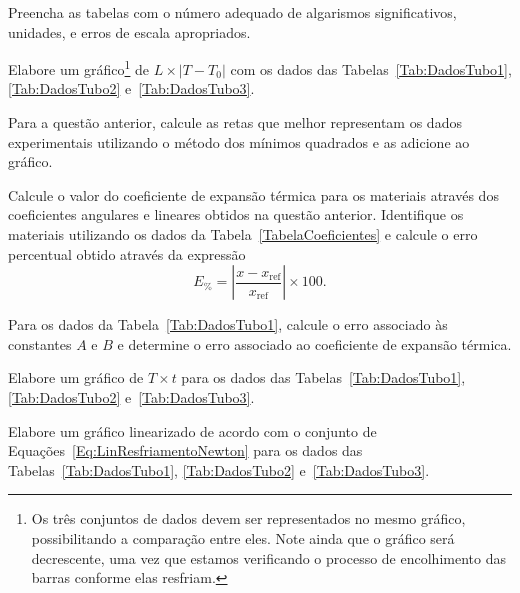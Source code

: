 \begin{question}[type={exam}]{0.5}
Preencha as tabelas com o número adequado de algarismos significativos, unidades, e erros de escala apropriados. 
\end{question}

\begin{question}[type={exam}]{1.0}
Elabore um gráfico\footnote{Os três conjuntos de dados devem ser representados no mesmo gráfico, possibilitando a comparação entre eles. Note ainda que o gráfico será decrescente, uma vez que estamos verificando o processo de encolhimento das barras conforme elas resfriam.} de $L \times |T - T_0|$ com os dados das Tabelas~\ref{Tab:DadosTubo1}, \ref{Tab:DadosTubo2} e~\ref{Tab:DadosTubo3}.
\end{question}

\begin{question}[type={exam}]{0.5}
Para a questão anterior, calcule as retas que melhor representam os dados experimentais utilizando o método dos mínimos quadrados e as adicione ao gráfico.
\end{question}
 
\begin{question}[type={exam}]{1}
Calcule o valor do coeficiente de expansão térmica para os materiais através dos coeficientes angulares e lineares obtidos na questão anterior. Identifique os materiais utilizando os dados da Tabela~\ref{TabelaCoeficientes} e calcule o erro percentual obtido através da expressão
\begin{equation}
	E_{\%} = \left|\frac{x-x_{\textrm{ref}}}{x_{\textrm{ref}}}\right| \times 100.
\end{equation}
\end{question}

\begin{question}[type={exam}]{1}
Para os dados da Tabela~\ref{Tab:DadosTubo1}, calcule o erro associado às constantes $A$ e $B$ e determine o erro associado ao coeficiente de expansão térmica.
\end{question}

\begin{question}[type={exam}]{1}
Elabore um gráfico de $T \times t$ para os dados das  Tabelas~\ref{Tab:DadosTubo1}, \ref{Tab:DadosTubo2} e~\ref{Tab:DadosTubo3}.
\end{question}

\begin{question}[type={exam}]{1}
Elabore um gráfico linearizado de acordo com o conjunto de Equações~\eqref{Eq:LinResfriamentoNewton} para os dados das  Tabelas~\ref{Tab:DadosTubo1}, \ref{Tab:DadosTubo2} e~\ref{Tab:DadosTubo3}.
\end{question}

